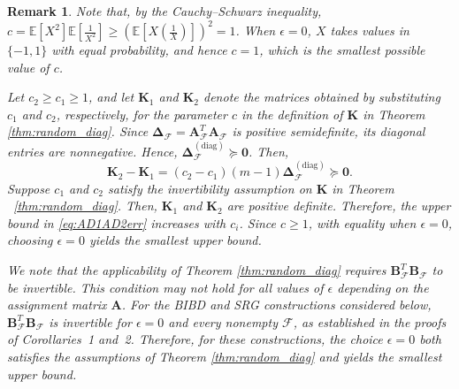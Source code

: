 \documentclass[journal,draftcls,onecolumn]{IEEEtran}
\theoremstyle{mystyle}
\newtheorem{remark}{Remark}
\begin{document}
\begin{remark}\label{rem:c_equals_one}
Note that, by the Cauchy--Schwarz inequality, $
c=\mathbb{E}[X^2]\mathbb{E}\left[\frac{1}{X^2}\right]
\geq \left(\mathbb{E}\left[X\left(\frac{1}{X}\right)\right]\right)^2=1
$. When $\epsilon=0$, $X$ takes values in $\{-1,1\}$ with equal probability, and hence $c=1$, which is the smallest possible value of $c$. 


Let $c_2\geq c_1\geq 1$, and let $\mathbf{K}_1$ and $\mathbf{K}_2$ denote the matrices obtained by substituting $c_1$ and $c_2$, respectively, for the parameter $c$ in the definition of $\mathbf{K}$ in Theorem \ref{thm:random_diag}. Since $\mathbf{\Delta}_{\mathcal{F}}=\mathbf{A}_{\mathcal{F}}^T\mathbf{A}_{\mathcal{F}}$ is positive semidefinite, its diagonal entries are nonnegative. Hence, $\mathbf{\Delta}_{\mathcal{F}}^{(\text{diag})}\succeq\mathbf{0}$. Then,
\[
\mathbf{K}_2-\mathbf{K}_1
=(c_2-c_1)(m-1)\mathbf{\Delta}_{\mathcal{F}}^{(\mathrm{diag})}
\succeq \mathbf{0}.
\]
Suppose $c_1$ and $c_2$ satisfy the invertibility assumption on $\mathbf{K}$ in Theorem ~\ref{thm:random_diag}. Then, $\mathbf{K}_1$ and $\mathbf{K}_2$ are positive definite. Therefore, the upper bound in \eqref{eq:AD1AD2err} increases with $c_i$.  Since $c\geq 1$, with equality when $\epsilon=0$, choosing $\epsilon=0$ yields the smallest upper bound. 



We note that the applicability of Theorem \ref{thm:random_diag} requires $\mathbf{B}_{\mathcal{F}}^T 
\mathbf{B}_{\mathcal{F}}$ to be invertible. This condition may not hold for all values of $\epsilon$ depending on the assignment matrix $\mathbf{A}$. For the BIBD and SRG constructions considered below, 
$\mathbf{B}_{\mathcal{F}}^T \mathbf{B}_{\mathcal{F}}$ is invertible for $\epsilon = 0$ and every 
nonempty $\mathcal{F}$, as established in the proofs of Corollaries~1
and~2. Therefore, for these constructions, the choice $\epsilon = 0$ both satisfies 
the assumptions of Theorem \ref{thm:random_diag} and yields the smallest upper bound.

\end{remark}
\end{document}

